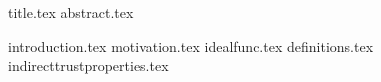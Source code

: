\documentclass[11pt]{llncs}
\begin{document}
{title.tex}
\thispagestyle{plain}
{abstract.tex}

{introduction.tex}
{motivation.tex}
{idealfunc.tex}
{definitions.tex}
{indirecttrustproperties.tex}

\end{document}
